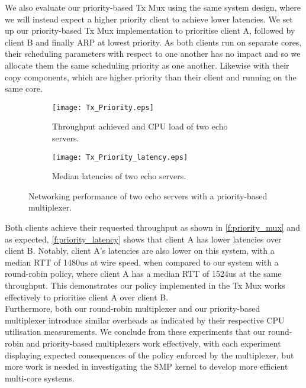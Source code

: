 We also evaluate our priority-based Tx Mux using the same system design, where we will instead expect a higher priority client to achieve lower
latencies. We set up our priority-based Tx Mux implementation to prioritise client A, followed by client B and finally ARP at lowest priority.
As both clients run on separate cores, their scheduling parameters with respect to one another has no impact and so we allocate them the same
scheduling priority as one another. Likewise with their copy components, which are higher priority than their client and running on the same core. 

\noindent\begin{figure}[h]
    \centering
	\begin{multicols}{2}
		\begin{subfigure}[b]{0.45\textwidth}
        \centering
        \texttt{[image: Tx\_Priority.eps]}
        \caption{Throughput achieved and CPU load of two echo servers.}
        \label{f:priority_mux}
    \end{subfigure}\qquad
    \begin{subfigure}[b]{0.45\textwidth}
        \vspace{52pt}
        \centering
        \texttt{[image: Tx\_Priority\_latency.eps]}
        \vspace{0.5pt}
        \caption{Median latencies of two echo servers.}
        \label{f:priority_latency}
    \end{subfigure}
\end{multicols}
\caption{Networking performance of two echo servers with a priority-based multiplexer.}
\end{figure}

Both clients achieve their requested throughput as shown in \autoref{f:priority_mux} and as expected, \autoref{f:priority_latency} shows
that client A has lower latencies over client B. Notably, client A's latencies are also lower on this system, with a median RTT
of 1480us at wire speed, when compared to our system with a round-robin policy, where client A has a median RTT of 1524us at the same
throughput. This demonstrates our policy implemented in the Tx Mux works effectively to prioritise
client A over client B.\\
Furthermore, both our round-robin multiplexer and our priority-based multiplexer introduce similar overheads as indicated by their 
respective CPU utilisation measurements. We conclude from these experiments that our round-robin and priority-based multiplexers work
effectively, with each experiment displaying expected consequences of the policy enforced by the multiplexer, but more work is needed in
investigating the SMP kernel to develop more efficient multi-core systems.


